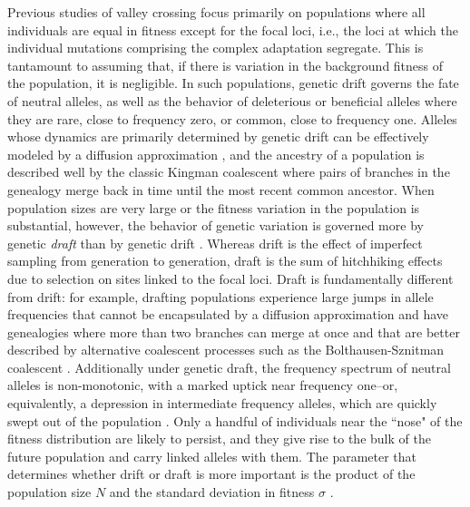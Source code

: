 \documentclass[rmp]{revtex4}
\begin{document}
\begin{spacing}{1.5}
Previous studies of valley crossing focus primarily on populations where all individuals are equal in fitness except for the focal loci, i.e., the loci at which the individual mutations comprising the complex adaptation segregate.
This is tantamount to assuming that, if there is variation in the background fitness of the population, it is negligible.
In such populations, genetic drift governs the fate of neutral alleles, as well as the behavior of deleterious or beneficial alleles where they are rare, close to frequency zero, or common, close to frequency one.
Alleles whose dynamics are primarily determined by genetic drift can be effectively modeled by a diffusion approximation \citep{Wright:1945,Kimura:1955,Kimura:1957}, and the ancestry of a population is described well by the classic Kingman coalescent \citep{Kingman:1982} where pairs of branches in the genealogy merge back in time until the most recent common ancestor.
When population sizes are very large or the fitness variation in the population is substantial, however, the behavior of genetic variation is governed more by genetic \emph{draft} than by genetic drift \citep{gillespie_2000, gillespie_2001, masel_2011, neher_shraiman_2011}.
Whereas drift is the effect of imperfect sampling from generation to generation, draft is the sum of hitchhiking effects due to selection on sites linked to the focal loci.
Draft is fundamentally different from drift: for example, drafting populations experience large jumps in allele frequencies that cannot be encapsulated by a diffusion approximation \citep{neher_shraiman_2011}
and have genealogies where more than two branches can merge at once and that are better described by alternative coalescent processes such as the Bolthausen-Sznitman coalescent \citep{neher_hallatschek_2013, brunet_2007, schweinsberg_2017}.
Additionally under genetic draft, the frequency spectrum of neutral alleles is non-monotonic, with a marked uptick near frequency one--or, equivalently, a depression in intermediate frequency alleles, which are quickly swept out of the population \citep{neher_shraiman_2011,kosheleva_2013,neher_hallatschek_2013}.
Only a handful of individuals near the ``nose" of the fitness distribution are likely to persist, and they give rise to the bulk of the future population and carry linked alleles with them.
The parameter that determines whether drift or draft is more important is the product of the population size $N$ and the standard deviation in fitness $\sigma$ \citep{neher_hallatschek_2013}.


\end{spacing}
\end{document}
